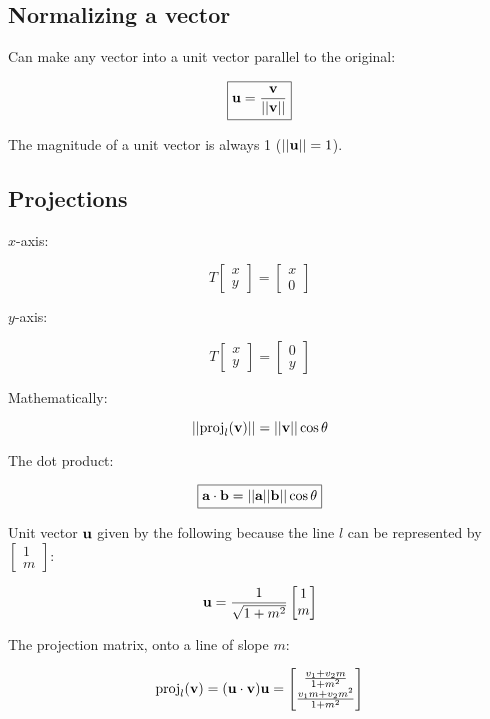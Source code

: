 \subsection{Normalizing a vector}

Can make any vector into a unit vector parallel to the original:

\[\boxed{\textbf{u}=\frac{\textbf{v}}{||\textbf{v}||}}\]

The magnitude of a unit vector is always 1 ($||\textbf{u}||=1$).

\subsection{Projections}

$x$-axis:

\[
      T \begin{bmatrix}x\\ y\end{bmatrix}=
      \begin{bmatrix}x\\ 0\end{bmatrix}
\]

$y$-axis:

\[
  T \begin{bmatrix}x\\ y\end{bmatrix}
  = \begin{bmatrix}0\\ y\end{bmatrix}
\]

Mathematically:

\[||\mathrm{proj}_l(\textbf{v})||=||\textbf{v}||\cos\theta\]

The dot product:

\[\boxed{\textbf{a}\cdot \textbf{b}=||\textbf{a}||\textbf{b}||\cos\theta}\]

Unit vector $\textbf{u}$ given by the following because the line $l$ can be represented by $\begin{bmatrix}
    1\\m
\end{bmatrix}$:

\[\textbf{u}=\frac{1}{\sqrt{1+m^2}}\begin{bmatrix}
    1\\m
\end{bmatrix}\]

The projection matrix, onto a line of slope $m$:

\[
    \mathrm{proj}_l(\textbf{v})=(\textbf{u}\cdot \textbf{v})\textbf{u} = 
    \begin{bmatrix}\frac{v_1+v_2m}{1+m^2}\\\frac{v_1m+v_2m^2}{1+m^2} \end{bmatrix}  
\]


